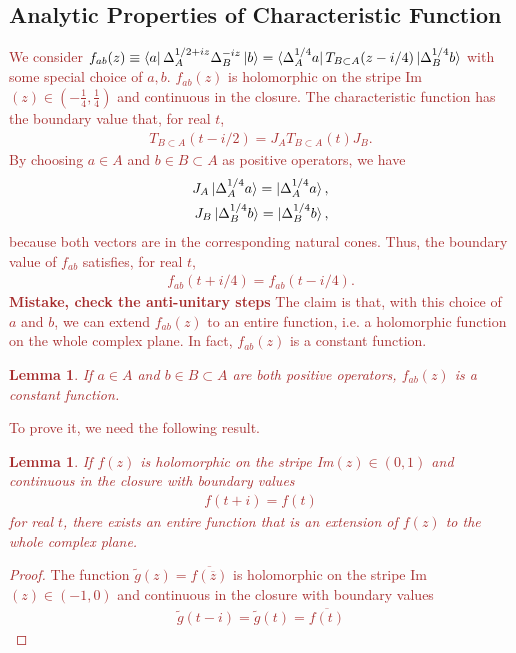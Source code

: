 \documentclass[a4paper,11pt]{article}
\newtheorem{lemma}[theorem]{Lemma}
\theoremstyle{definition}
\newcommand{\KL}[1]{\textcolor{brown}{#1}}
\begin{document}
\subsection{Analytic Properties of Characteristic Function}
\KL{We consider $f_{ab}(z) \equiv \bra{a}\Delta_A^{1/2+iz}\Delta_B^{-iz}\ket{b} = \bra{\Delta_A^{1/4}a} T_{B\subset A}(z-i/4)\ket{\Delta_B^{1/4} b} $ with some special choice of $a,b$. $f_{ab}(z)$ is holomorphic on the stripe Im$(z) \in (-\frac{1}{4}, \frac{1}{4})$ and continuous in the closure. The characteristic function has the boundary value that, for real $t$,
\begin{align}
    T_{B\subset A}(t-i/2) = J_AT_{B\subset A}(t)J_B.
\end{align}
By choosing $a\in A$ and $b\in B \subset A$ as positive operators, we have
\begin{align}
    J_A \ket{\Delta_A^{1/4}a} = \ket{\Delta_A^{1/4}a},\nonumber\\
    J_B \ket{\Delta_B^{1/4}b} = \ket{\Delta_B^{1/4}b},
\end{align}
because both vectors are in the corresponding natural cones. Thus, the boundary value of $f_{ab}$ satisfies, for real $t$,
\begin{align}
    f_{ab}(t+i/4) = f_{ab}(t-i/4).
\end{align}
\textbf{Mistake, check the anti-unitary steps}
The claim is that, with this choice of $a$ and $b$, we can extend $f_{ab}(z)$ to an entire function, i.e. a holomorphic function on the whole complex plane. In fact, $f_{ab}(z)$ is a constant function. 
\begin{lemma}
    If $a\in A$ and $b\in B \subset A$ are both positive operators, $f_{ab}(z)$ is a constant function.
\end{lemma}
To prove it, we need the following result.
\begin{lemma}
    If $f(z)$ is holomorphic on the stripe Im$(z) \in (0,1)$ and continuous in the closure with boundary values
    \begin{align}
        f(t+i) = f(t)
    \end{align}
    for real $t$, there exists an entire function that is an extension of $f(z)$ to the whole complex plane.
\end{lemma}
\begin{proof}
    The function $\tilde{g}(z) = \overline{f(\overline{z})}$ is holomorphic on the stripe Im$(z) \in (-1,0)$ and continuous in the closure with boundary values
    \begin{align}
        \tilde{g}(t-i) = \tilde{g}(t) = \overline{f(t)}

\end{align}
\end{proof}}
\end{document}
